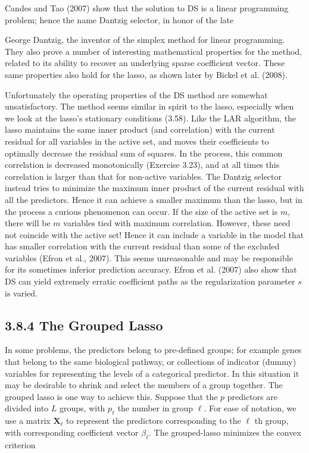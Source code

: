 \documentclass[10pt]{article}
\begin{document}
Candes and Tao (2007) show that the solution to DS is a linear programming problem; hence the name Dantzig selector, in honor of the late

George Dantzig, the inventor of the simplex method for linear programming. They also prove a number of interesting mathematical properties for the method, related to its ability to recover an underlying sparse coefficient vector. These same properties also hold for the lasso, as shown later by Bickel et al. (2008).

Unfortunately the operating properties of the DS method are somewhat unsatisfactory. The method seems similar in spirit to the lasso, especially when we look at the lasso's stationary conditions (3.58). Like the LAR algorithm, the lasso maintains the same inner product (and correlation) with the current residual for all variables in the active set, and moves their coefficients to optimally decrease the residual sum of squares. In the process, this common correlation is decreased monotonically (Exercise 3.23), and at all times this correlation is larger than that for non-active variables. The Dantzig selector instead tries to minimize the maximum inner product of the current residual with all the predictors. Hence it can achieve a smaller maximum than the lasso, but in the process a curious phenomenon can occur. If the size of the active set is $m$, there will be $m$ variables tied with maximum correlation. However, these need not coincide with the active set! Hence it can include a variable in the model that has smaller correlation with the current residual than some of the excluded variables (Efron et al., 2007). This seems unreasonable and may be responsible for its sometimes inferior prediction accuracy. Efron et al. (2007) also show that DS can yield extremely erratic coefficient paths as the regularization parameter $s$ is varied.

\subsection*{3.8.4 The Grouped Lasso}
In some problems, the predictors belong to pre-defined groups; for example genes that belong to the same biological pathway, or collections of indicator (dummy) variables for representing the levels of a categorical predictor. In this situation it may be desirable to shrink and select the members of a group together. The grouped lasso is one way to achieve this. Suppose that the $p$ predictors are divided into $L$ groups, with $p_{\ell}$ the number in group $\ell$. For ease of notation, we use a matrix $\mathbf{X}_{\ell}$ to represent the predictors corresponding to the $\ell$ th group, with corresponding coefficient vector $\beta_{\ell}$. The grouped-lasso minimizes the convex criterion
\end{document}
